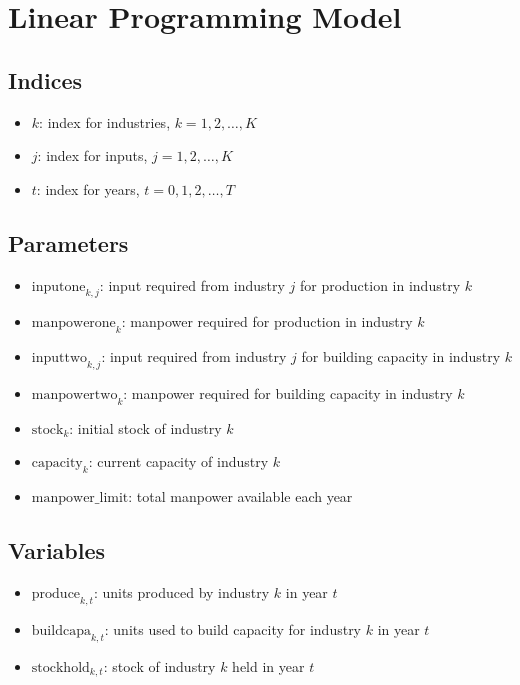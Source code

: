 \documentclass{article}
\begin{document}
\section*{Linear Programming Model}

\subsection*{Indices}
\begin{itemize}
    \item \( k \): index for industries, \( k = 1, 2, \ldots, K \)
    \item \( j \): index for inputs, \( j = 1, 2, \ldots, K \)
    \item \( t \): index for years, \( t = 0, 1, 2, \ldots, T \)
\end{itemize}

\subsection*{Parameters}
\begin{itemize}
    \item \( \text{inputone}_{k,j} \): input required from industry \( j \) for production in industry \( k \)
    \item \( \text{manpowerone}_k \): manpower required for production in industry \( k \)
    \item \( \text{inputtwo}_{k,j} \): input required from industry \( j \) for building capacity in industry \( k \)
    \item \( \text{manpowertwo}_k \): manpower required for building capacity in industry \( k \)
    \item \( \text{stock}_k \): initial stock of industry \( k \)
    \item \( \text{capacity}_k \): current capacity of industry \( k \)
    \item \( \text{manpower\_limit} \): total manpower available each year
\end{itemize}

\subsection*{Variables}
\begin{itemize}
    \item \( \text{produce}_{k,t} \): units produced by industry \( k \) in year \( t \)
    \item \( \text{buildcapa}_{k,t} \): units used to build capacity for industry \( k \) in year \( t \)
    \item \( \text{stockhold}_{k,t} \): stock of industry \( k \) held in year \( t \)
\end{itemize}
\end{document}
